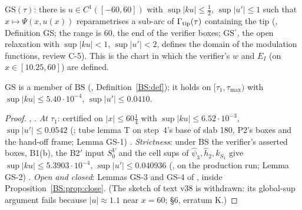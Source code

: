 \documentclass[11pt]{article}
\begin{document}
\begin{definition}\label{C:def:GS}
$\mathrm{GS}(\tau)$: there is $u\in C^1([-60,60])$ with $\sup|ku|\le\frac12$, $\sup|u'|\le1$ such that $x\mapsto\Psi(x,u(x))$ reparametrises a sub-arc of $\Gamma_{\rm tip}(\tau)$ containing the tip (, Definition GS; the range is $60$, the end of the verifier boxes; $\mathrm{GS}^\circ$, the open relaxation with $\sup|ku|<1$, $\sup|u'|<2$, defines the domain of the modulation functions, review C-5). This is the chart in which the verifier's $w$ and $E_I$ (on $x\in[10.25,60]$) are defined.
\end{definition}
\begin{lemma}\label{C:lem:GS}
GS is a member of $\mathrm{BS}$ (, Definition~\ref{BS:def}); it holds on $[\tau_1,\tau_{\max})$ with $\sup|ku|\le5.40\cdot10^{-4}$, $\sup|u'|\le0.0410$.
\end{lemma}
\begin{proof}\tHd, \tC. \emph{At $\tau_1$}: certified on $|x|\le60\frac14$ with $\sup|ku|\le6.52\cdot10^{-3}$, $\sup|u'|\le0.0542$ (; tube lemma T on step~4's base of slab 180, P2's boxes and the hand-off frame;  Lemma GS-1) \tC. \emph{Strictness}: under $\mathrm{BS}$ the verifier's asserted boxes, B1(b), the B2$'$ input $S^V_0$ and the cell sups of $\hat\psi_3,\hat h_2,k_{S_1}$ give $\sup|ku|\le5.3903\cdot10^{-4}$, $\sup|u'|\le0.040936$ (, on the  production run; Lemma GS-2) \tC. \emph{Open and closed}: Lemmas GS-3 and GS-4 of  \tHd, inside Proposition~\ref{BS:prop:close}. (The sketch of text v38 is withdrawn: its global-sup argument fails because $|u|\approx1.1$ near $x=60$;  \S6, erratum K.)
\end{proof}
\end{document}
